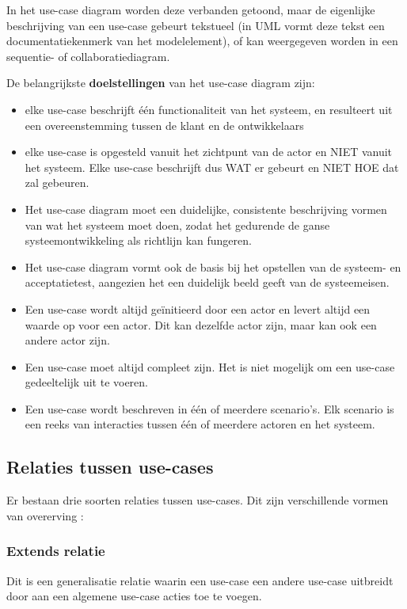 In het use-case diagram worden deze verbanden getoond, maar de eigenlijke beschrijving van een use-case gebeurt tekstueel (in UML vormt deze tekst een documentatiekenmerk van het modelelement), of kan weergegeven worden in een sequentie- of collaboratiediagram.

De belangrijkste \textbf{doelstellingen} van het use-case diagram zijn:

\begin{itemize}
    \item elke use-case beschrijft één functionaliteit van het systeem, en resulteert uit een overeenstemming tussen de klant en de ontwikkelaars
    \item elke use-case is opgesteld vanuit het zichtpunt van de actor en NIET vanuit het systeem. Elke use-case beschrijft dus WAT er gebeurt en NIET HOE dat zal gebeuren.
    \item Het use-case diagram moet een duidelijke, consistente beschrijving vormen van wat het systeem moet doen, zodat het gedurende de ganse systeemontwikkeling als richtlijn kan fungeren.
    \item Het use-case diagram vormt ook de basis bij het opstellen van de systeem- en acceptatietest, aangezien het een duidelijk beeld geeft van de systeemeisen.
    \item Een use-case wordt altijd geïnitieerd door een actor en levert altijd een waarde op voor een actor. Dit kan dezelfde actor zijn, maar kan ook een andere actor zijn.
    \item Een use-case moet altijd compleet zijn. Het is niet mogelijk om een use-case gedeeltelijk uit te voeren. 
    \item Een use-case wordt beschreven in één of meerdere scenario's. Elk scenario is een reeks van interacties tussen één of meerdere actoren en het systeem.
\end{itemize}

\subsection{Relaties tussen use-cases}

Er bestaan drie soorten relaties tussen use-cases. Dit zijn verschillende vormen van overerving :

\subsubsection{Extends relatie}

Dit is een generalisatie relatie waarin een use-case een andere use-case uitbreidt door aan een algemene use-case acties toe te voegen. 

